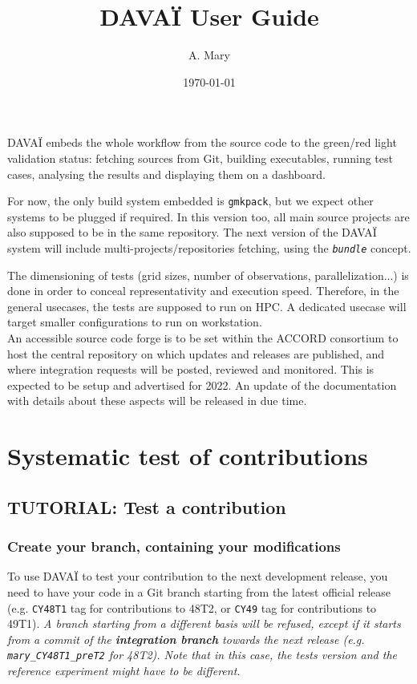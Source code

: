 \documentclass[a4paper,10pt,twoside]{article}
\title{DAVAÏ User Guide}
\author{A. Mary}
\date{\today}
\begin{document}
\maketitle

\tableofcontents
\vspace{1cm}
\newpage


DAVAÏ embeds the whole workflow from the source code to the green/red light validation status: fetching sources from Git, building executables, running test cases, analysing the results and displaying them on a dashboard.

For now, the only build system embedded is \texttt{gmkpack}, but we expect other systems to be plugged if required. In this version too, all main source projects are also supposed to be in the same repository. The next version of the DAVAÏ system will include multi-projects/repositories fetching, using the \textit{\texttt{bundle}} concept.

The dimensioning of tests (grid sizes, number of observations, parallelization...) is done in order to conceal representativity and execution speed. Therefore, in the general usecases, the tests are supposed to run on HPC. A dedicated usecase will target smaller configurations to run on workstation.\\

An accessible source code forge is to be set within the ACCORD consortium to host the central repository on which updates and releases are published, and where integration requests will be posted, reviewed and monitored. This is expected to be setup and advertised for 2022.
An update of the documentation with details about these aspects will be released in due time.



\newpage
\section{Systematic test of contributions}

\subsection{TUTORIAL: Test a contribution} 
\subsubsection{Create your branch, containing your modifications}
To use DAVAÏ to test your contribution to the next development release, you need to have your code in a Git branch starting from the latest official release (e.g. \texttt{CY48T1} tag for contributions to 48T2, or \texttt{CY49} tag for contributions to 49T1). \textit{A branch starting from a different basis will be refused, except if it starts from a commit of the \textbf{integration branch} towards the next release (e.g. \texttt{\textit{mary\_CY48T1\_preT2}} for 48T2). Note that in this case, the tests version and the reference experiment might have to be different.}\\
\end{document}
